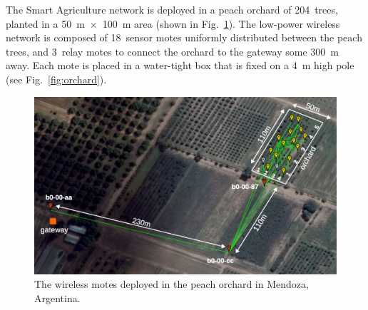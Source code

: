 \documentclass{elsarticle}
\newcommand{\agri}                {Smart Agriculture\xspace}
\begin{document}

The \agri network is deployed in a peach orchard of 204~trees, planted in a 50~m~$\times$~100~m area (shown in Fig.~\ref{fig:peach_map}).
The low-power wireless network is composed of 18~sensor motes uniformly distributed between the peach trees, and 3~relay motes to connect the orchard to the gateway some 300~m away.
Each mote is placed in a water-tight box that is fixed on a 4~m high pole (see Fig.~\ref{fig:orchard}).

\begin{figure}
    \begin{minipage}[b]{0.66\textwidth}
        \centering
        \includegraphics[width=\textwidth]{map_annotated}
        \caption{The wireless motes deployed in the peach orchard in Mendoza, Argentina.\newline}
        \label{fig:peach_map}
    \end{minipage}
    \hfill
    \begin{minipage}[b]{0.3\textwidth}

\end{minipage}
\end{figure}
\end{document}
